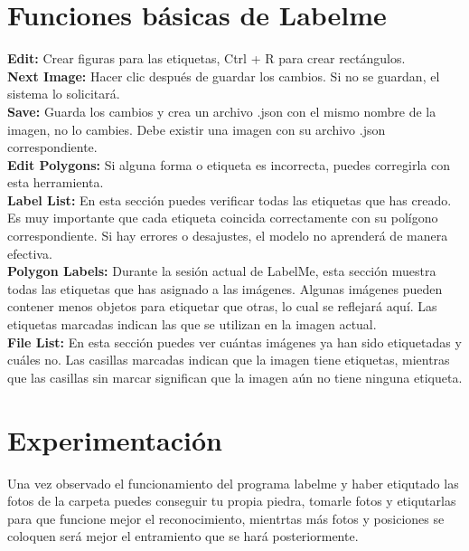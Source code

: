 \documentclass[letter,11pt]{article} %
\begin{document}
        \section{Funciones básicas de Labelme}
        \textbf{Edit: }Crear figuras para las etiquetas, Ctrl + R para crear rectángulos. \\

        \textbf{Next Image: }Hacer clic después de guardar los cambios. Si no se guardan, el sistema lo solicitará.\\
        
        \textbf{Save: }Guarda los cambios y crea un archivo .json con el mismo nombre de la imagen, no lo cambies.
        Debe existir una imagen con su archivo .json correspondiente.\\
        
        \textbf{Edit Polygons: }Si alguna forma o etiqueta es incorrecta, puedes corregirla con esta herramienta.\\
        
        \textbf{Label List: }En esta sección puedes verificar todas las etiquetas que has creado. Es muy importante que cada etiqueta coincida correctamente con su polígono correspondiente. Si hay errores o desajustes, el modelo no aprenderá de manera efectiva.\\
        
        \textbf{Polygon Labels: }Durante la sesión actual de LabelMe, esta sección muestra todas las etiquetas que has asignado a las imágenes. Algunas imágenes pueden contener menos objetos para etiquetar que otras, lo cual se reflejará aquí. Las etiquetas marcadas indican las que se utilizan en la imagen actual.\\
        
        \textbf{File List: }En esta sección puedes ver cuántas imágenes ya han sido etiquetadas y cuáles no. Las casillas marcadas indican que la imagen tiene etiquetas, mientras que las casillas sin marcar significan que la imagen aún no tiene ninguna etiqueta.
	
	
    
    \section{Experimentación}
		Una vez observado el funcionamiento del programa labelme y haber etiqutado las fotos de la carpeta puedes conseguir tu propia piedra, tomarle fotos y etiqutarlas para que funcione mejor el reconocimiento, mientrtas más fotos y posiciones se coloquen será mejor el entramiento que se hará posteriormente.
	
\end{document}
